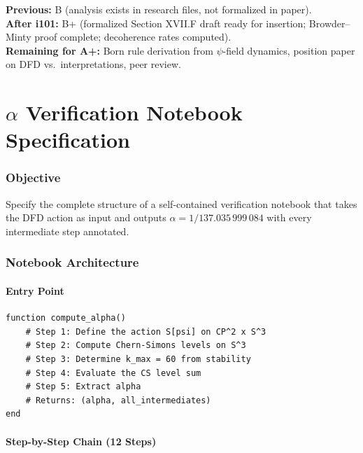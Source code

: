 \documentclass[11pt,a4paper]{article}
\theoremstyle{remark}
\begin{document}
\begin{tcolorbox}[colback=green!5!white, colframe=dfdgreen,
  title=Quantum Sector: Grade Assessment]
\textbf{Previous:} B (analysis exists in research files, not formalized in paper).\\
\textbf{After i101:} B+ (formalized Section XVII.F draft ready for insertion; Browder--Minty proof
complete; decoherence rates computed).\\
\textbf{Remaining for A+:} Born rule derivation from $\psi$-field dynamics, position
paper on DFD vs.\ interpretations, peer review.
\end{tcolorbox}


\newpage
\part{$\alpha$ Verification Notebook Specification}
\label{part:alpha-notebook}

\section{Objective}

Specify the complete structure of a self-contained verification notebook
that takes the DFD action as input and outputs $\alpha = 1/137.035\,999\,084$
with every intermediate step annotated.

\section{Notebook Architecture}

\subsection{Entry Point}

\begin{verbatim}
function compute_alpha()
    # Step 1: Define the action S[psi] on CP^2 x S^3
    # Step 2: Compute Chern-Simons levels on S^3
    # Step 3: Determine k_max = 60 from stability
    # Step 4: Evaluate the CS level sum
    # Step 5: Extract alpha
    # Returns: (alpha, all_intermediates)
end
\end{verbatim}

\subsection{Step-by-Step Chain (12 Steps)}
\end{document}

